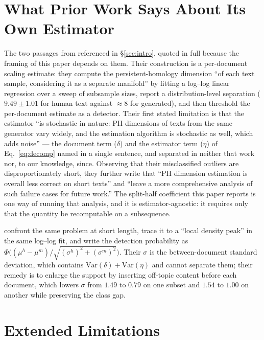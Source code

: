 \documentclass{article}
\begin{document}
\section{What Prior Work Says About Its Own Estimator}
\label{app:priorwork}

The two passages from \citet{tulchinskii2023intrinsic} referenced in
\S\ref{sec:intro}, quoted in full because the framing of this paper depends on
them. Their construction is a per-document scaling estimate: they compute the
persistent-homology dimension ``of each text sample, considering it as a separate
manifold'' by fitting a log--log linear regression over a sweep of subsample
sizes, report a distribution-level separation ($9.49\pm1.01$ for human text
against $\approx\!8$ for generated), and then threshold the per-document estimate
as a detector. Their first stated limitation is that the estimator ``is
stochastic in nature: PH dimensions of texts from the same generator vary widely,
and the estimation algorithm is stochastic as well, which adds noise'' --- the
document term ($\delta$) and the estimator term ($\eta$) of Eq.~\ref{eq:decomp}
named in a single sentence, and separated in neither that work nor, to our
knowledge, since. Observing that their misclassified outliers are
disproportionately short, they further write that ``PH dimension estimation is
overall less correct on short texts'' and ``leave a more comprehensive analysis
of such failure cases for future work.'' The split-half coefficient this paper
reports is one way of running that analysis, and it is estimator-agnostic: it
requires only that the quantity be recomputable on a subsequence.

\citet{wei2025shortphd} confront the same problem at short length, trace it to a
``local density peak'' in the same log--log fit, and write the detection
probability as
$\Phi\big((\mu^{h}-\mu^{m})/\sqrt{(\sigma^{h})^{2}+(\sigma^{m})^{2}}\big)$. Their
$\sigma$ is the between-document standard deviation, which contains
$\mathrm{Var}(\delta)+\mathrm{Var}(\eta)$ and cannot separate them; their remedy
is to enlarge the support by inserting off-topic content before each document,
which lowers $\sigma$ from $1.49$ to $0.79$ on one subset and $1.54$ to $1.00$ on
another while preserving the class gap.

\section{Extended Limitations}
\label{app:limitations}
\end{document}
